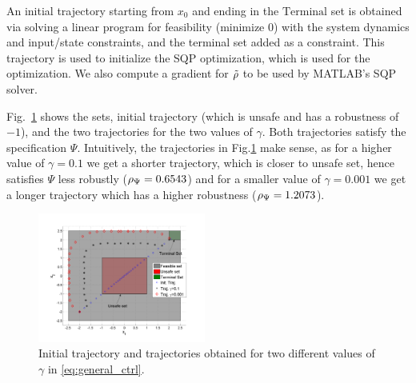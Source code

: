 An initial trajectory starting from $x_0$ and ending in the $\text{Terminal}$ set is obtained via solving a linear program for feasibility ($\text{minimize } 0$) with the system dynamics and input/state constraints, and the terminal set added as a constraint. This trajectory is used to initialize the SQP optimization, which is used for the optimization. We also compute a gradient for $\tilde{\rho}$ to be used by MATLAB's SQP solver.

Fig.~\ref{fig:toy control} shows the sets, initial trajectory (which is unsafe and has a robustness of $-1$), and the two trajectories for the two values of $\gamma$. Both trajectories satisfy the specification $\Psi$. Intuitively, the trajectories in Fig.\ref{fig:toy control} make sense, as for a higher value of $\gamma=0.1$ we get a shorter trajectory, which is closer to unsafe set, hence satisfies $\Psi$ less robustly ($\rho_{\Psi}=0.6543$) and for a smaller value of $\gamma=0.001$ we get a longer trajectory which has a higher robustness ($\rho_{\Psi}=1.2073$).

\begin{figure}[t]
\centering
\includegraphics[width=0.49\textwidth]{figures/ToyExampleControl}
\caption{Initial trajectory and trajectories obtained for two different values of $\gamma$ in \eqref{eq:general_ctrl}.}
\label{fig:toy control}
\end{figure}